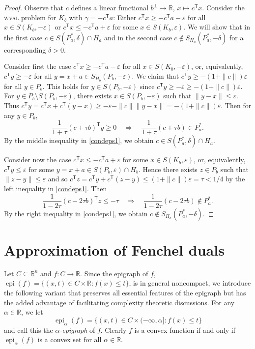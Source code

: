 \documentclass[11pt,reqno]{amsart}
\theoremstyle{definition}
\theoremstyle{remark}
\begin{document}
\begin{proof}
Observe that $c$ defines a linear functional $b^{\perp} \to \mathbb{R}$, $x\mapsto c^\mathsf{T} x$.  Consider the \textsc{wval} problem for $K_b$ with $\gamma=-c^\mathsf{T} a$:
Either $c^\mathsf{T}x\ge -c^\mathsf{T} a -\varepsilon$ for all $x\in S(K_b,-\varepsilon)$ or  $c^\mathsf{T}x\le -c^\mathsf{T}a +\varepsilon$ for some $x\in S(K_b,\varepsilon)$.
We will show that in the first case $c\in S(P_a^*,\delta)\cap H_a $ and in the second case $c\not\in S_{H_a}(P_a^*,-\delta)$ for a corresponding $\delta >0$.

Consider first the case $c^\mathsf{T}x\ge -c^\mathsf{T} a -\varepsilon$ for all $x\in S(K_b,-\varepsilon)$, or, equivalently, $c^\mathsf{T}y \ge -\varepsilon$ for all $y = x + a \in S_{H_b}(P_b,-\varepsilon)$. 
We claim that $c^\mathsf{T}y\ge -(1+\|c\|)\varepsilon$ for all $y\in P_b$. This holds for $y \in  S(P_b,-\varepsilon)$ since  $c^\mathsf{T}y \ge -\varepsilon \ge -(1+\|c\|)\varepsilon$. For 
$y\in P_b\setminus S(P_b,-\varepsilon)$, there exists $x\in S(P_b,-\varepsilon)$ such that $\|y-x\|\le \varepsilon$.
Thus $c^\mathsf{T} y=c^\mathsf{T}x+ c^\mathsf{T}(y-x)\ge -\varepsilon -\|c\|\|y-x\|=-(1+\|c\|)\varepsilon$.
Then for any $ y\in P_b$,
\[
\frac{1}{1+\tau}(c+\tau b)^\mathsf{T} y\ge 0 \quad \Rightarrow\quad \frac{1}{1+\tau}(c+\tau b)\in P_a^*.
\] 
By the middle inequality in \eqref{condeps1}, we obtain $c\in S(P_a^*,\delta)\cap H_a$.

Consider now the case $c^\mathsf{T}x\le -c^\mathsf{T}a +\varepsilon$ for some $x\in S(K_b,\varepsilon)$, or, equivalently, $c^\mathsf{T} y \le \varepsilon$ for some $y = x + a\in S(P_b,\varepsilon)\cap H_b$.  Hence there exists $z\in P_b$ such that $\|z - y\|\le \varepsilon$ and so $c^\mathsf{T} z=c^\mathsf{T} y +c^\mathsf{T}(z- y)\le (1+\|c\|)\varepsilon=\tau<1/4$ by the left inequality in \eqref{condeps1}.  Then
\[\frac{1}{1-2 \tau}(c-2\tau b)^\mathsf{T} z\le - \tau \quad \Rightarrow \quad \frac{1}{1-2 \tau}(c-2\tau b) \not\in P_a^*.\] 
By the right inequality in \eqref{condeps1}, we obtain $c\not\in S_{H_a}(P_a^*,-\delta)$.
\end{proof}

\section{Approximation of Fenchel duals}\label{sec:fenchel}

Let $C\subseteq \mathbb{R}^n$ and $f: C \to \mathbb{R}$. Since the epigraph of $f$,
$\operatorname{epi}(f)=\{(x,t)\in C \times \mathbb{R} : f(x)\le t\}$, is in general noncompact, we introduce the following variant that preserves all essential features of the epigraph but has the added advantage of facilitating complexity theoretic discussions. For any $\alpha\in\mathbb{R}$, we let
\[
\operatorname{epi}_\alpha(f)=\{(x,t)\in C \times (-\infty, \alpha] :  f(x)\le t\}
\]
and call this the \emph{$\alpha$-epigraph} of $f$.
Clearly $f$ is a convex function if and only if $\operatorname{epi}_\alpha(f)$ is a convex set for all $\alpha \in \mathbb{R}$.
\end{document}
